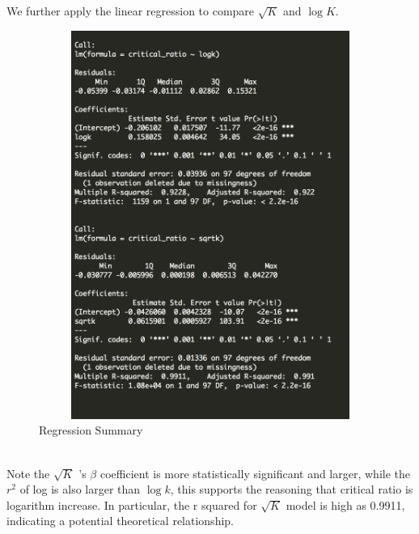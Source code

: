 \documentclass[10pt,english]{article}\usepackage{graphicx, color}
\numberwithin{equation}{section}
\numberwithin{figure}{section}
\begin{document}
\quad\\
\quad\\
We further apply the linear regression to compare $\sqrt{K}$ and $\log{K}$.\\
\begin{figure}[htbp]
\centering\includegraphics[width=4.8in, height=5in]{reg}
\caption{Regression Summary}
\end{figure}
\quad\\
Note the $\sqrt{K}$ 's $\beta$ coefficient is more statistically significant and larger, while the $r^2$ of log is also larger than $\log{k}$, this supports the reasoning that critical ratio is logarithm increase. In particular, the r squared for  $\sqrt{K}$ model is high as 0.9911, indicating a potential theoretical relationship.
\end{document}

